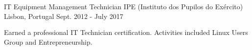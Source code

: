 \begin{cventries}
  \vspace{0.4cm}


  \cventry
  {IT Equipment Management Technician} %
  {IPE (Instituto dos Pupilos do Exército)} %
  {Lisbon, Portugal} %
  {Sept. 2012 - July 2017} %
  {
    \begin{cvitems}
      \item {Earned a professional IT Technician certification. Activities included Linux Users Group and Entrepreneurship.}
    \end{cvitems}
  }

  \vspace{0.4cm}


\end{cventries}

